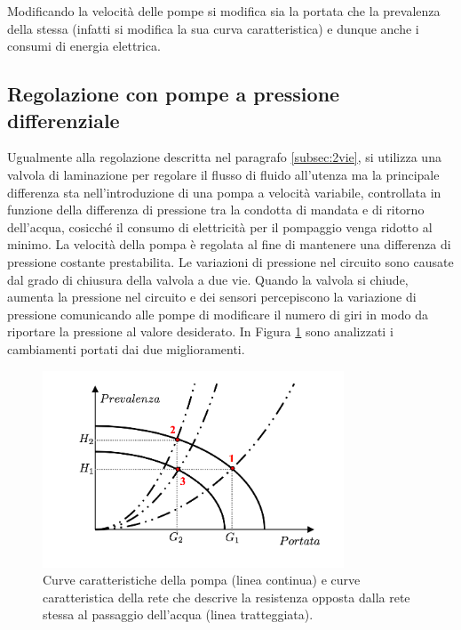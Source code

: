 \documentclass[laurea,oneside,11pt]{USiena_tesiLM3}
\begin{document}
Modificando la velocità delle pompe si modifica sia la portata che la prevalenza della stessa (infatti si modifica la sua curva caratteristica) e dunque anche i consumi di energia elettrica. 

\subsection{Regolazione con pompe a pressione differenziale}
Ugualmente alla regolazione descritta nel paragrafo \ref{subsec:2vie}, si utilizza una valvola di laminazione per regolare il flusso di fluido all'utenza ma la principale differenza sta nell'introduzione di una pompa a velocità variabile, controllata in funzione della differenza di pressione tra la condotta di mandata e di ritorno dell'acqua, cosicché il consumo di elettricità per il pompaggio venga ridotto al minimo.
 La velocità della pompa è regolata al fine di mantenere una differenza di pressione costante prestabilita. Le variazioni di pressione nel circuito sono causate dal grado di chiusura della valvola a due vie. Quando la valvola si chiude, aumenta la pressione nel circuito e dei sensori percepiscono la variazione di pressione comunicando alle pompe di modificare il numero di giri in modo da riportare la pressione al valore desiderato. In Figura \ref{fig:giri_variabili} sono analizzati i cambiamenti portati dai due miglioramenti.

\begin{figure}[!ht]
\centering
\includegraphics[width=0.8\textwidth]{figure/giri_variabili}
\caption{Curve caratteristiche della pompa (linea continua) e curve caratteristica della rete che descrive la resistenza opposta dalla rete stessa al passaggio dell'acqua (linea tratteggiata).}
\label{fig:giri_variabili}
\end{figure}
\end{document}
